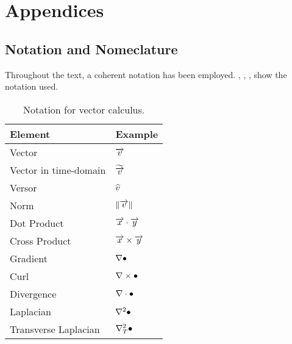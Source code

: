 \appendix

\part{Appendices}

\chapter{Notation and Nomeclature}

Throughout the text, a coherent notation has been
employed. , ,
, 
show the notation used.

\begin{table}[htbp]
  \begin{center}
    \begin{tabular}{ll}
      \hline
      Element & Example\\
      \hline
      Vector & $\overrightarrow{v}$ \\
      Vector in time-domain & $\widetilde{\overrightarrow{v}}$ \\
      Versor & $\widehat{v}$ \\
      Norm & $\left\lVert\overrightarrow{v}\right\rVert$ \\
      Dot Product & ${\overrightarrow{x} \cdot \overrightarrow{y}}$ \\
      Cross Product & ${\overrightarrow{x} \times \overrightarrow{y}}$ \\
      Gradient & ${\nabla \bullet}$ \\
      Curl & ${\nabla \times \bullet}$ \\
      Divergence & ${\nabla \cdot \bullet}$ \\
      Laplacian & ${\nabla^2 \bullet}$ \\
      Transverse Laplacian & ${\nabla^2_T \bullet}$ \\
      \hline
    \end{tabular}
  \end{center}
  \caption{Notation for vector calculus.}
  \label{tab:notation_vector}
\end{table}

